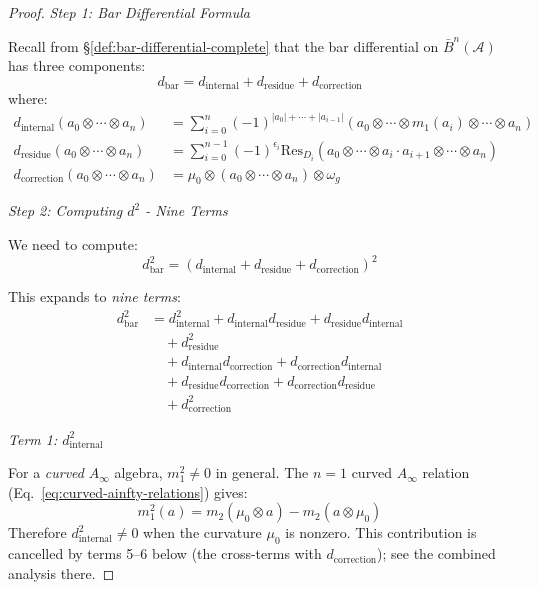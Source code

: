 \begin{proof}

\emph{Step 1: Bar Differential Formula}

Recall from \S\ref{def:bar-differential-complete} that the bar differential on 
$\bar{B}^n(\mathcal{A})$ has three components:
\begin{equation}
d_{\text{bar}} = d_{\text{internal}} + d_{\text{residue}} + d_{\text{correction}}
\end{equation}
where:
\begin{align}
d_{\text{internal}}(a_0 \otimes \cdots \otimes a_n) 
&= \sum_{i=0}^n (-1)^{|a_0| + \cdots + |a_{i-1}|} (a_0 \otimes \cdots \otimes m_1(a_i) 
\otimes \cdots \otimes a_n) \\
d_{\text{residue}}(a_0 \otimes \cdots \otimes a_n) 
&= \sum_{i=0}^{n-1} (-1)^{\epsilon_i} \text{Res}_{D_i}(a_0 \otimes \cdots \otimes a_i \cdot a_{i+1} 
\otimes \cdots \otimes a_n) \\
d_{\text{correction}}(a_0 \otimes \cdots \otimes a_n) 
&= \mu_0 \otimes (a_0 \otimes \cdots \otimes a_n) \otimes \omega_g
\end{align}

\emph{Step 2: Computing $d^2$ - Nine Terms}

We need to compute:
\begin{equation}
d_{\text{bar}}^2 = (d_{\text{internal}} + d_{\text{residue}} + d_{\text{correction}})^2
\end{equation}

This expands to \emph{nine terms}:
\begin{align}
d_{\text{bar}}^2 &= d_{\text{internal}}^2 
+ d_{\text{internal}} d_{\text{residue}} + d_{\text{residue}} d_{\text{internal}} \\
&\quad + d_{\text{residue}}^2 \\
&\quad + d_{\text{internal}} d_{\text{correction}} + d_{\text{correction}} d_{\text{internal}} \\
&\quad + d_{\text{residue}} d_{\text{correction}} + d_{\text{correction}} d_{\text{residue}} \\
&\quad + d_{\text{correction}}^2
\end{align}

\emph{Term 1: $d_{\text{internal}}^2$}

For a \emph{curved} $A_\infty$ algebra, $m_1^2 \neq 0$ in general. The $n=1$ curved $A_\infty$ relation (Eq.~\ref{eq:curved-ainfty-relations}) gives:
\begin{equation}\label{eq:curved-m1-squared}
m_1^2(a) = m_2(\mu_0 \otimes a) - m_2(a \otimes \mu_0)
\end{equation}
Therefore $d_{\text{internal}}^2 \neq 0$ when the curvature $\mu_0$ is nonzero. This contribution is cancelled by terms 5--6 below (the cross-terms with $d_{\text{correction}}$); see the combined analysis there.


\end{proof}
